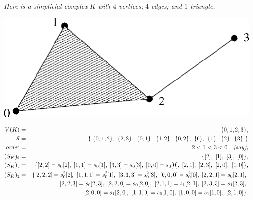 \begin{example}
\emph{Here is a simplicial complex $K$ with $4$ vertices; $4$ edges; 
and $1$ triangle.} 
\begin{center}
\includegraphics[scale = 0.7]{simp-gps/simp-set.eps}
\end{center}
\begin{eqnarray*}
   V(K) &=& \{0,1,2,3\}, \\
      S &=& \{~ \{0,1,2\},~ \{2,3\},~ \{0,1\},~ \{1,2\},~ \{0,2\},~ 
             \{0\},~ \{1\},~ \{2\},~ \{3\}~ \} \\
\text{\emph{order}} &=& 2 < 1 < 3 < 0 \quad\text{\emph{(say)}},\\
(S_K)_0 &=& \{ [2],~ [1],~ [3],~ [0] \}, \\
(S_K)_1 &=& \{ [2,2]=s_0[2],~ [1,1]=s_0[1],~ [3,3]=s_0[3],~ [0,0]=s_0[0],~ 
                       [2,1],~ [2,3],~ [2,0],~ [1,0] \}, \\
(S_K)_2 &=& \{ [2,2,2]=s_0^2[2],~ [1,1,1]=s_0^2[1],~ [3,3,3]=s_0^2[3],~ 
               [0,0,0]=s_0^2[0],~ [2,2,1]=s_0[2,1],~ \\
        & &  \qquad  [2,2,3]=s_0[2,3],~ [2,2,0]=s_0[2,0],~ [2,1,1]=s_1[2,1],~ 
               [2,3,3]=s_1[2,3],~ \\ 
        & &  \qquad  [2,0,0]=s_1[2,0],~ [1,1,0]=s_0[1,0],~ [1,0,0]=s_1[1,0],~ 
               [2,1,0] \}. 
\end{eqnarray*}
\end{example}

